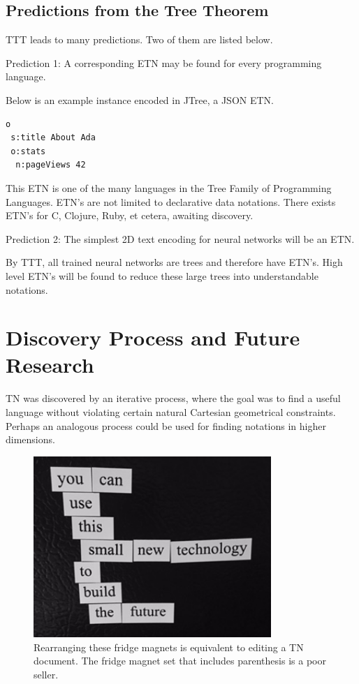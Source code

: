\documentclass[journal]{IEEEtran}
\begin{document}
\subsection{Predictions from the Tree Theorem}

TTT leads to many predictions. Two of them are listed below.

Prediction 1: A corresponding ETN may be found for every programming language.

Below is an example instance encoded in JTree, a JSON ETN.

\begin{lstlisting}
o
 s:title About Ada
 o:stats
  n:pageViews 42
\end{lstlisting}

This ETN is one of the many languages in the Tree Family of Programming Languages. ETN's are not limited to declarative data notations. There exists ETN's for C, Clojure, Ruby, et cetera, awaiting discovery.

Prediction 2: The simplest 2D text encoding for neural networks will be an ETN.

By TTT,  all trained neural networks are trees and therefore have ETN's. High level ETN's will be found to reduce these large trees into understandable notations.

\section{Discovery Process and Future Research}

TN was discovered by an iterative process, where the goal was to find a useful language without violating certain natural Cartesian geometrical constraints. Perhaps an analogous process could be used for finding notations in higher dimensions.

\begin{figure}[ht!]
\centering
\includegraphics[width=90mm]{tree.jpg}
\caption{Rearranging these fridge magnets is equivalent to editing a TN document. The fridge magnet set that includes parenthesis is a poor seller.}
\end{figure}
\end{document}
